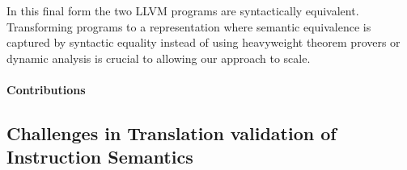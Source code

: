 In this final form the two LLVM programs are syntactically equivalent. Transforming programs to a representation where semantic equivalence is captured by syntactic equality instead of using heavyweight theorem provers or dynamic analysis is crucial to allowing our approach to scale.






\paragraph{Contributions}





\subsection{Challenges in Translation validation of Instruction Semantics}
\label{sec:challenges-in-formalizing-x86}

